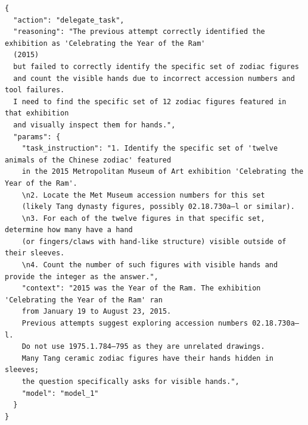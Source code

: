 \begin{tcolorbox}[
  title={\textbf{\small Attempt 2 - Main Decision}},
  boxrule=1pt,
  arc=0mm,
  colback=gray!5,
  colframe=gray!70,
  breakable,
  before skip=10pt,
  after skip=10pt,
  pad at break=2mm,
  parbox=false
]
\begin{verbatim}
{
  "action": "delegate_task",
  "reasoning": "The previous attempt correctly identified the exhibition as 'Celebrating the Year of the Ram' 
  (2015) 
  but failed to correctly identify the specific set of zodiac figures 
  and count the visible hands due to incorrect accession numbers and tool failures. 
  I need to find the specific set of 12 zodiac figures featured in that exhibition 
  and visually inspect them for hands.",
  "params": {
    "task_instruction": "1. Identify the specific set of 'twelve animals of the Chinese zodiac' featured 
    in the 2015 Metropolitan Museum of Art exhibition 'Celebrating the Year of the Ram'.
    \n2. Locate the Met Museum accession numbers for this set 
    (likely Tang dynasty figures, possibly 02.18.730a–l or similar).
    \n3. For each of the twelve figures in that specific set, determine how many have a hand 
    (or fingers/claws with hand-like structure) visible outside of their sleeves.
    \n4. Count the number of such figures with visible hands and provide the integer as the answer.",
    "context": "2015 was the Year of the Ram. The exhibition 'Celebrating the Year of the Ram' ran 
    from January 19 to August 23, 2015. 
    Previous attempts suggest exploring accession numbers 02.18.730a–l. 
    Do not use 1975.1.784–795 as they are unrelated drawings.
    Many Tang ceramic zodiac figures have their hands hidden in sleeves;
    the question specifically asks for visible hands.",
    "model": "model_1"
  }
}
\end{verbatim}
\end{tcolorbox}

